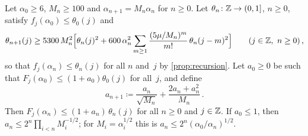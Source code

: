 \documentclass[11pt,letterpaper]{article}
\begin{document}
\begin{proposition}
\label{prop:oneline}
Let $\alpha_0\ge6$, $M_n\ge100$ and $\alpha_{n+1}=M_n\alpha_n$ for $n\ge0$. Let $\theta_n\colon\mathbb Z\to(0,1]$, $n\ge0$, satisfy $f_j(\alpha_0)\le\theta_0(j)$ and
\begin{equation}
\label{eq:closure}
  \theta_{n+1}(j)\ge5300\,M_n^2\Bigl[\theta_n(j)^2+600\,\alpha_n^2\sum_{m\ge1}\frac{(5\mu/M_n)^m}{m!}\,\theta_n(j-m)^2\Bigr]\qquad(j\in\Z,\ n\ge0)\,,
\end{equation}
so that $f_j(\alpha_n)\le\theta_n(j)$ for all $n$ and~$j$ by \cref{prop:recursion}. Let $a_0\ge0$ be such that $F_j(\alpha_0)\le(1+a_0)\theta_0(j)$ for all~$j$, and define
\begin{equation}
\label{eq:an}
  a_{n+1}\coloneqq\frac{a_n}{\sqrt{M_n}}+\frac{2a_n+a_n^2}{M_n}\,.
\end{equation}
Then $F_j(\alpha_n)\le(1+a_n)\,\theta_n(j)$ for all $n\ge0$ and $j\in\mathbb Z$. If $a_0\le1$, then $a_n\le2^n\prod_{i<n}M_i^{-1/2}$; for $M_i=\alpha_i^{1/2}$ this is $a_n\le2^n(\alpha_0/\alpha_n)^{1/2}$.
\end{proposition}
\end{document}
